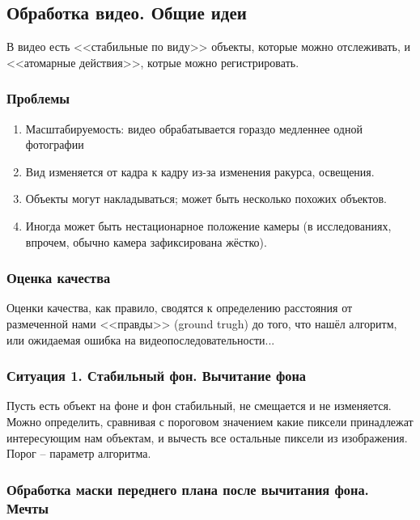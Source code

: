 \documentclass[main.tex]{subfiles}
\begin{document}
\subsection{Обработка видео. Общие идеи}

В видео есть <<стабильные по виду>> объекты, которые можно отслеживать, и <<атомарные действия>>, котрые можно регистрировать.

\subsubsection{Проблемы}

\begin{enumerate}[noitemsep]
    \item Масштабируемость: видео обрабатывается гораздо медленнее одной фотографии
    \item Вид изменяется от кадра к кадру из-за изменения ракурса, освещения.
    \item Объекты могут накладываться; может быть несколько похожих объектов.
    \item Иногда может быть нестационарное положение камеры (в исследованиях, впрочем, обычно камера зафиксирована жёстко).
\end{enumerate}

\subsubsection{Оценка качества}

Оценки качества, как правило, сводятся к определению расстояния от размеченной нами <<правды>> (ground trugh) до того, что нашёл алгоритм, или ожидаемая ошибка на видеопоследовательности...

\subsubsection{Ситуация 1. Стабильный фон. Вычитание фона}

Пусть есть объект на фоне и фон стабильный, не смещается и не изменяется.
Можно определить, сравнивая с пороговом значением какие пиксели принадлежат интересующим нам объектам, и вычесть все остальные пиксели из изображения.
Порог -- параметр алгоритма.

\subsubsection{Обработка маски переднего плана после вычитания фона. Мечты}
\end{document}
